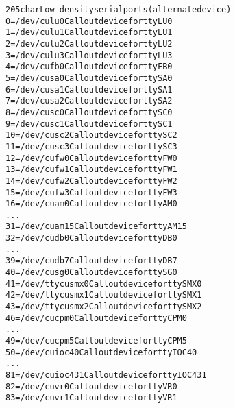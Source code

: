 \documentclass[a4paper,8pt,english]{sphinxmanual}
\begin{document}
\begin{alltt}
 205 char       Low-density serial ports (alternate device)
                  0 = /dev/culu0                Callout device for ttyLU0
                  1 = /dev/culu1                Callout device for ttyLU1
                  2 = /dev/culu2                Callout device for ttyLU2
                  3 = /dev/culu3                Callout device for ttyLU3
                  4 = /dev/cufb0                Callout device for ttyFB0
                  5 = /dev/cusa0                Callout device for ttySA0
                  6 = /dev/cusa1                Callout device for ttySA1
                  7 = /dev/cusa2                Callout device for ttySA2
                  8 = /dev/cusc0                Callout device for ttySC0
                  9 = /dev/cusc1                Callout device for ttySC1
                 10 = /dev/cusc2                Callout device for ttySC2
                 11 = /dev/cusc3                Callout device for ttySC3
                 12 = /dev/cufw0                Callout device for ttyFW0
                 13 = /dev/cufw1                Callout device for ttyFW1
                 14 = /dev/cufw2                Callout device for ttyFW2
                 15 = /dev/cufw3                Callout device for ttyFW3
                 16 = /dev/cuam0                Callout device for ttyAM0
                    ...
                 31 = /dev/cuam15               Callout device for ttyAM15
                 32 = /dev/cudb0                Callout device for ttyDB0
                    ...
                 39 = /dev/cudb7                Callout device for ttyDB7
                 40 = /dev/cusg0                Callout device for ttySG0
                 41 = /dev/ttycusmx0            Callout device for ttySMX0
                 42 = /dev/ttycusmx1            Callout device for ttySMX1
                 43 = /dev/ttycusmx2            Callout device for ttySMX2
                 46 = /dev/cucpm0               Callout device for ttyCPM0
                    ...
                 49 = /dev/cucpm5               Callout device for ttyCPM5
                 50 = /dev/cuioc40              Callout device for ttyIOC40
                    ...
                 81 = /dev/cuioc431             Callout device for ttyIOC431
                 82 = /dev/cuvr0                Callout device for ttyVR0
                 83 = /dev/cuvr1                Callout device for ttyVR1


\end{alltt}
\end{document}
